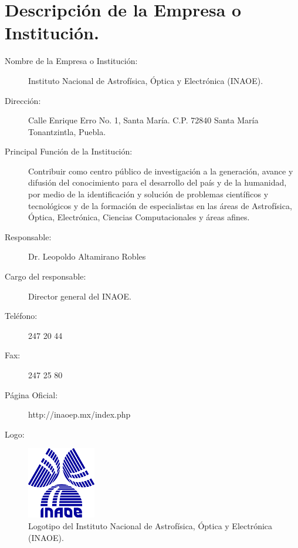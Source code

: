 \section{Descripción de la Empresa o Institución.}

\begin{description}
	\item [Nombre de la Empresa o Institución:] Instituto Nacional de Astrofísica, Óptica y Electrónica (INAOE).
	\item [Dirección:] Calle Enrique Erro No. 1, Santa María. C.P. 72840 Santa María Tonantzintla, Puebla.
	\item [Principal Función de la Institución:] Contribuir como centro público de investigación a la generación, avance y difusión del conocimiento para el desarrollo del país y de la humanidad, por medio de la identificación y solución de problemas científicos y tecnológicos y de la formación de especialistas en las áreas de Astrofísica, Óptica, Electrónica, Ciencias Computacionales y áreas afines.
    \item [Responsable:] Dr. Leopoldo Altamirano Robles 
    \item [Cargo del responsable:] Director general del INAOE.
    \item [Teléfono:] 247 20 44
    \item [Fax:] 247 25 80
    \item [Página Oficial:] http://inaoep.mx/index.php
    \item [Logo:] 
\end{description}

\begin{figure}[!h]
	\centering
	\includegraphics[width=3cm]{img/inaoe.png}
    \caption{Logotipo del Instituto Nacional de Astrofísica, Óptica y Electrónica (INAOE).}
\end{figure}

